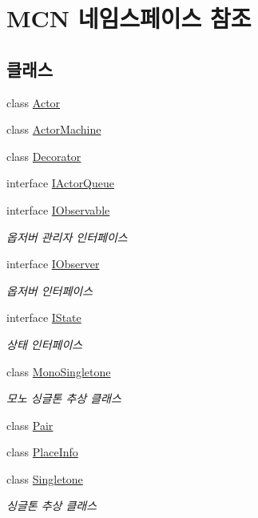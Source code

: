 \hypertarget{namespace_m_c_n}{}\section{M\+CN 네임스페이스 참조}
\label{namespace_m_c_n}
\subsection*{클래스}
\begin{DoxyCompactItemize}
\item 
class \hyperlink{class_m_c_n_1_1_actor}{Actor}
\item 
class \hyperlink{class_m_c_n_1_1_actor_machine}{Actor\+Machine}
\item 
class \hyperlink{class_m_c_n_1_1_decorator}{Decorator}
\item 
interface \hyperlink{interface_m_c_n_1_1_i_actor_queue}{I\+Actor\+Queue}
\item 
interface \hyperlink{interface_m_c_n_1_1_i_observable}{I\+Observable}
\begin{DoxyCompactList}\small\item\em 옵저버 관리자 인터페이스 \end{DoxyCompactList}\item 
interface \hyperlink{interface_m_c_n_1_1_i_observer}{I\+Observer}
\begin{DoxyCompactList}\small\item\em 옵저버 인터페이스 \end{DoxyCompactList}\item 
interface \hyperlink{interface_m_c_n_1_1_i_state}{I\+State}
\begin{DoxyCompactList}\small\item\em 상태 인터페이스 \end{DoxyCompactList}\item 
class \hyperlink{class_m_c_n_1_1_mono_singletone}{Mono\+Singletone}
\begin{DoxyCompactList}\small\item\em 모노 싱글톤 추상 클래스 \end{DoxyCompactList}\item 
class \hyperlink{class_m_c_n_1_1_pair}{Pair}
\item 
class \hyperlink{class_m_c_n_1_1_place_info}{Place\+Info}
\item 
class \hyperlink{class_m_c_n_1_1_singletone}{Singletone}
\begin{DoxyCompactList}\small\item\em 싱글톤 추상 클래스 \end{DoxyCompactList}\item 

\end{DoxyCompactItemize}
